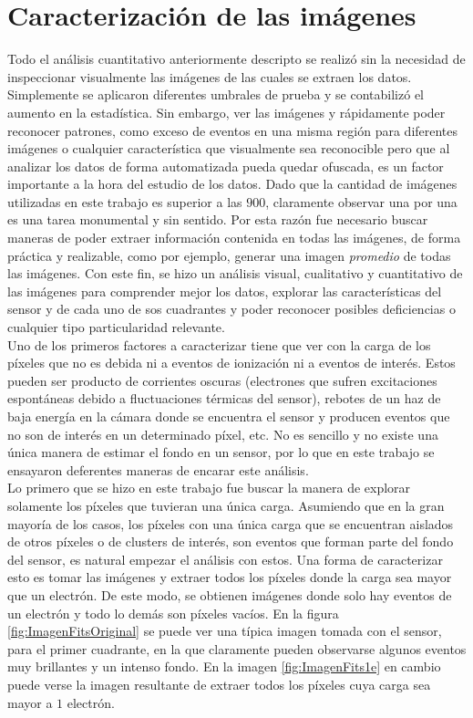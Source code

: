 \section{Caracterización de las imágenes}
\noindent Todo el análisis cuantitativo anteriormente descripto se realizó sin la necesidad de inspeccionar visualmente las imágenes de las cuales se extraen los datos. Simplemente se aplicaron diferentes umbrales de prueba y se contabilizó el aumento en la estadística. Sin embargo, ver las imágenes y rápidamente poder reconocer patrones, como exceso de eventos en una misma región para diferentes imágenes o cualquier característica que visualmente sea reconocible pero que al analizar los datos de forma automatizada pueda quedar ofuscada, es un factor importante a la hora del estudio de los datos. Dado que la cantidad de imágenes utilizadas en este trabajo es superior a las $900$, claramente observar una por una es una tarea monumental y sin sentido. Por esta razón fue necesario buscar maneras de poder extraer información contenida en todas las imágenes, de forma práctica y realizable, como por ejemplo, generar una imagen \textit{promedio} de todas las imágenes. Con este fin, se hizo un análisis visual, cualitativo y cuantitativo de las imágenes para comprender mejor los datos, explorar las características del sensor y de cada uno de sos cuadrantes y poder reconocer posibles deficiencias o cualquier tipo particularidad relevante.\\
\indent Uno de los primeros factores a caracterizar tiene que ver con la carga de los píxeles que no es debida ni a eventos de ionización ni a eventos de interés. Estos pueden ser producto de corrientes oscuras (electrones que sufren excitaciones espontáneas debido a fluctuaciones térmicas del sensor), rebotes de un haz de baja energía en la cámara donde se encuentra el sensor y producen eventos que no son de interés en un determinado píxel, etc. No es sencillo y no existe una única manera de estimar el fondo en un sensor, por lo que en este trabajo se ensayaron deferentes maneras de encarar este análisis. \\
\indent Lo primero que se hizo en este trabajo fue buscar la manera de explorar solamente los píxeles que tuvieran una única carga. Asumiendo que en la gran mayoría de los casos, los píxeles con una única carga que se encuentran aislados de otros píxeles o de clusters de interés, son eventos que forman parte del fondo del sensor, es natural empezar el análisis con estos. Una forma de caracterizar esto es tomar las imágenes y extraer todos los píxeles donde la carga sea mayor que un electrón. De este modo, se obtienen imágenes donde solo hay eventos de un electrón y todo lo demás son píxeles vacíos. En la figura \ref{fig:ImagenFitsOriginal} se puede ver una típica imagen tomada con el sensor, para el primer cuadrante, en la que claramente pueden observarse algunos eventos muy brillantes y un intenso fondo. En la imagen \ref{fig:ImagenFits1e} en cambio puede verse la imagen resultante de extraer todos los píxeles cuya carga sea mayor a $1$ electrón.
